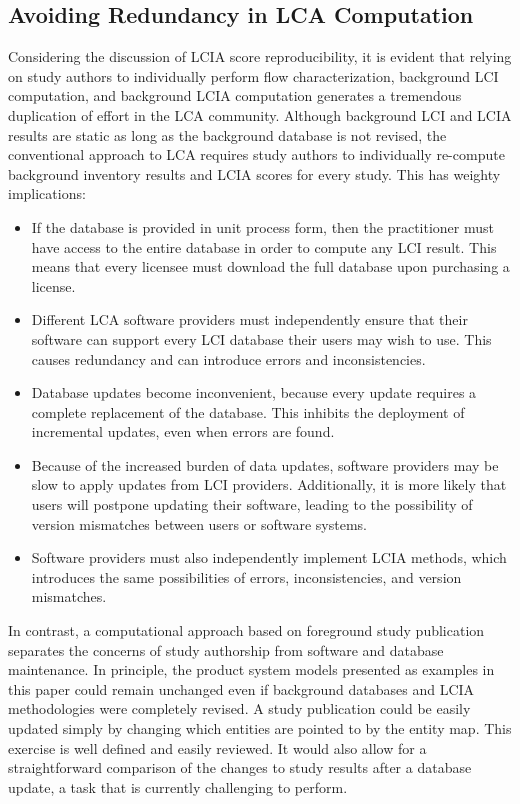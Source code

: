 \subsection{Avoiding Redundancy in LCA Computation}

Considering the discussion of LCIA score reproducibility, it is evident that relying on study authors to individually perform flow characterization, background LCI computation, and background LCIA computation generates a tremendous duplication of effort in the LCA community.  Although background LCI and LCIA results are static as long as the background database is not revised, the conventional approach to LCA requires study authors to individually re-compute background inventory results and LCIA scores for every study.  This has weighty implications:

\begin{itemize}
\item If the database is provided in unit process form, then the practitioner must have access to the entire database in order to compute any LCI result.  This means that every licensee must download the full database upon purchasing a license.
\item Different LCA software providers must independently ensure that their software can support every LCI database their users may wish to use.  This %
  causes redundancy and can introduce errors and inconsistencies.
\item Database updates become inconvenient, because every update requires a complete replacement of the database. This inhibits the deployment of incremental updates, even when errors are found.
\item Because of the increased burden of data updates, software providers may be slow to apply updates from LCI providers.  Additionally, it is more likely that users will postpone updating their software, leading to the possibility of version mismatches between users or software systems.
\item Software providers must also independently implement LCIA methods, which introduces the same possibilities of errors, inconsistencies, and version mismatches.
\end{itemize}

In contrast, a computational approach based on foreground study publication separates the concerns of study authorship from software and database maintenance.  In principle, the product system models presented as examples in this paper could remain unchanged even if background databases and LCIA methodologies were completely revised.  A study publication could be easily updated simply by changing which entities are pointed to by the entity map.  This exercise is well defined and easily reviewed.  It would also allow for a straightforward comparison of the changes to study results after a database update, a task that is currently challenging to perform.

